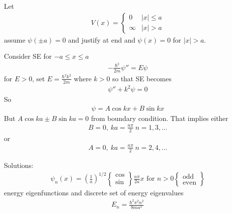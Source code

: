 \documentclass[a4paper]{article}
\begin{document}
Let
\begin{equation*}
\begin{aligned}
V\left(x\right) = \left\{
\begin{array}{ll}
0 & |x| \leq a\\
\infty & |x| > a
\end{array}
\right.
\end{aligned}
\end{equation*}
assume $\psi\left(\pm a\right) = 0$ and justify at end and $\psi\left(x\right) = 0$ for $|x|>a$.

Consider SE for $-a\leq x \leq a$
\begin{equation*}
\begin{aligned}
-\frac{\hbar^2}{2m} \psi'' = E\psi
\end{aligned}
\end{equation*}
for $E>0$, set $E = \frac{\hbar^2 k^2}{2m}$ where $k>0$ so that SE becomes
\begin{equation*}
\begin{aligned}
\psi'' + k^2 \psi = 0
\end{aligned}
\end{equation*}
So
\begin{equation*}
\begin{aligned}
\psi = A \cos kx + B \sin kx
\end{aligned}
\end{equation*}
But $A\cos ka \pm B \sin ka = 0$ from boundary condition. That implies either
\begin{equation*}
\begin{aligned}
B=0,\ ka = \frac{n\pi}{2} \ n=1,3,...
\end{aligned}
\end{equation*}
or
\begin{equation*}
\begin{aligned}
A=0,\ ka = \frac{n\pi}{2} \ n=2,4,...
\end{aligned}
\end{equation*}

Solutions:
\begin{equation*}
\begin{aligned}
\psi_n\left(x\right) = \left(\frac{1}{a}\right)^{1/2} \left\{
\begin{array}{ll}
\cos \\
\sin
\end{array}
\right\} \frac{n\pi}{2a}x \text{ for } n>0 \left\{
\begin{array}{ll}
\text{odd} \\
\text{even}
\end{array}
\right\}
\end{aligned}
\end{equation*}
energy eigenfunctions and discrete set of energy eigenvalues
\begin{equation*}
\begin{aligned}
E_n = \frac{\hbar^2 \pi^2 n^2}{8ma^2}
\end{aligned}
\end{equation*}
\end{document}

